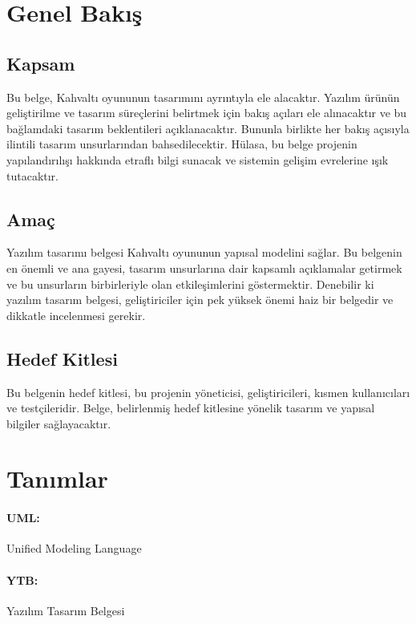 \documentclass[12pt,a4paper]{article}
\begin{document}
   
   \newpage

   \tableofcontents
   \newpage

   
   \section{Genel Bakış}
   \subsection{Kapsam}
   Bu belge, Kahvaltı oyununun tasarımını ayrıntıyla ele alacaktır. Yazılım ürünün geliştirilme ve tasarım süreçlerini belirtmek için bakış açıları ele alınacaktır ve bu bağlamdaki tasarım beklentileri açıklanacaktır. Bununla birlikte her bakış açısıyla ilintili tasarım unsurlarından bahsedilecektir. Hülasa, bu belge projenin yapılandırılışı hakkında etraflı bilgi sunacak ve sistemin gelişim evrelerine ışık tutacaktır.
   \subsection{Amaç}
   Yazılım tasarımı belgesi Kahvaltı oyununun yapısal modelini sağlar. Bu belgenin en önemli ve ana gayesi, tasarım unsurlarına dair kapsamlı açıklamalar getirmek ve bu unsurların birbirleriyle olan etkileşimlerini göstermektir. Denebilir ki yazılım tasarım belgesi, geliştiriciler için pek yüksek önemi haiz bir belgedir ve dikkatle incelenmesi gerekir.
   \subsection{Hedef Kitlesi}
   Bu belgenin hedef kitlesi, bu projenin yöneticisi, geliştiricileri, kısmen kullanıcıları ve testçileridir. Belge, belirlenmiş hedef kitlesine yönelik tasarım ve yapısal bilgiler sağlayacaktır.   

   \section{Tanımlar}
   \paragraph{UML:} Unified Modeling Language
   \paragraph{YTB:} Yazılım Tasarım Belgesi
\end{document}
